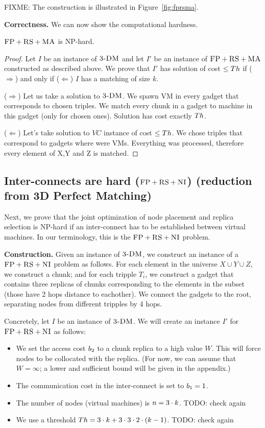 FIXME: The construction is illustrated in Figure~\ref{fig:fprsma}.

\textbf{Correctness.}
We can now show the computational hardness.
\begin{theorem}
$\textsc{FP}+\textsc{RS}+\textsc{MA}$ is NP-hard.
\end{theorem}
\begin{proof}
Let $I$ be an instance of $\textsc{3-DM}$ and let $I'$ be an instance of
$\textsc{FP}+\textsc{RS}+\textsc{MA}$ constructed as described above.
We prove that $I'$ has solution of cost $\leq Th$ if ($\Rightarrow$) and only if
($\Leftarrow$)
$I$ has a matching of size $k$.

($\Rightarrow$) Let us take a solution to $\textsc{3-DM}$. We spawn VM in every
gadget that corresponds to chosen triples. We match every chunk in a
gadget to machine in this gadget (only for chosen ones). Solution has
cost exactly $Th$.

($\Leftarrow$) Let's take solution to $VC$ instance of cost $\leq Th$. We
chose triples that correspond to gadgets where were VMs. Everything
was processed, therefore every element of X,Y and Z is matched.
\end{proof}


\subsection{Inter-connects are hard ($\textsc{FP}+\textsc{RS}+\textsc{NI}$) (reduction from 3D Perfect Matching)}\label{ssec:fprscc}


Next, we prove that the joint optimization of node placement and replica selection
is NP-hard if an inter-connect has to be established between virtual machines.
In our terminology, this is the $\textsc{FP}+\textsc{RS}+\textsc{NI}$ problem.


\textbf{Construction.}
Given an instance of $\textsc{3-DM}$, we construct an instance of a
$\textsc{FP}+\textsc{RS}+\textsc{NI}$ problem as follows. For each element
in the universe $X \cup Y \cup Z$, we construct a chunk; and for each
tripple $T_i$, we construct a gadget that contains
three replicas of chunks corresponding to the elements in the subset (those have 2 hops distance to eachother).
We connect the gadgets to the root, separating nodes from different tripples by 4 hops.

Concretely, let $I$ be an instance of $\textsc{3-DM}$. We will create an instance $I'$
for $\textsc{FP}+\textsc{RS}+\textsc{NI}$ as follows:
\begin{itemize}
\item We set the access cost $b_2$ to a chunk replica to a high value $W$. This will force
nodes to be collocated with the replica.
(For now, we can assume that $W=\infty$; a lower and sufficient bound will be given
in the appendix.)
\item The communication cost in the inter-connect is set to $b_1 = 1$.
\item The number of nodes (virtual machines) is $n = 3 \cdot k$. TODO: check again
\item We use a threshold $Th =  3 \cdot k + 3 \cdot 3 \cdot 2 \cdot (k - 1)$. TODO: check again
\end{itemize}

